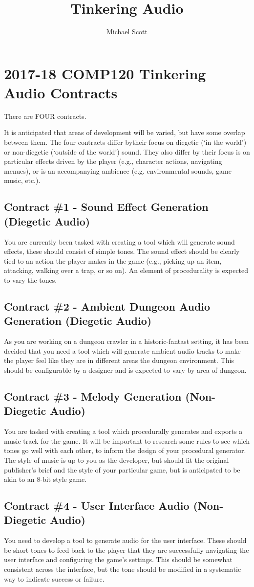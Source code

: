 \documentclass{../../fal_assignment}
\title{Tinkering Audio}
\author{Michael Scott}
\begin{document}
\section*{2017-18 COMP120 Tinkering Audio Contracts}

There are FOUR contracts.

It is anticipated that areas of development will be varied, but have some overlap between them. The four contracts differ bytheir focus on diegetic (`in the world') or non-diegetic (`outside of the world') sound. They also differ by their focus is on particular effects driven by the player (e.g., character actions, navigating menues), or is an accompanying ambience (e.g. environmental sounds, game music, etc.).

\subsection*{Contract \#1 - Sound Effect Generation (Diegetic Audio)}
You are currently been tasked with creating a tool which will generate sound effects, these should consist of simple tones. The sound effect should be clearly tied to an action the player makes in the game (e.g., picking up an item, attacking, walking over a trap, or so on). An element of procedurality is expected to vary the tones.

\subsection*{Contract \#2 - Ambient Dungeon Audio Generation (Diegetic Audio)}
As you are working on a dungeon crawler in a historic-fantast setting, it has been decided that you need a tool which will generate ambient audio tracks to make the player feel like they are in different areas the dungeon environment. This should be configurable by a designer and is expected to vary by area of dungeon.

\subsection*{Contract \#3 - Melody Generation (Non-Diegetic Audio)}
You are tasked with creating a tool which procedurally generates and exports a music track for the game. It will be important to research some rules to see which tones go well with each other, to inform the design of your procedural generator. The style of music is up to you as the developer, but should fit the original publisher's brief and the style of your particular game, but is anticipated to be akin to an 8-bit style game.

\subsection*{Contract \#4 - User Interface Audio (Non-Diegetic Audio)}
You need to develop a tool to generate audio for the user interface. These should be short tones to feed back to the player that they are successfully navigating the user interface and configuring the game's settings. This should be somewhat consistent across the interface, but the tone should be modified in a systematic way to indicate success or failure.
\end{document}
